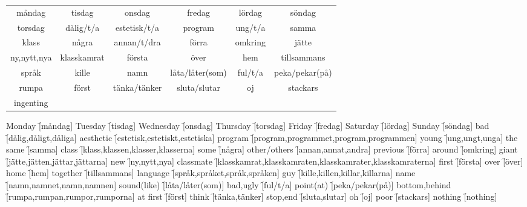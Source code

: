 \begin{center}
    \begin{tabular}{|c c c c c c|}
        \hline
        måndag & tisdag & onsdag & fredag & lördag & söndag \\
        torsdag & dålig/t/a & estetisk/t/a & program & ung/t/a & samma \\
        klass & några & annan/t/dra & förra & omkring & jätte \\
        ny,nytt,nya & klasskamrat & första & över & hem & tillsammans \\
        språk & kille & namn & låta/låter(som) & ful/t/a & peka/pekar(på) \\
        rumpa & först & tänka/tänker & sluta/slutar & oj & stackars \\
        ingenting &  &  &  &  &  \\
        \hline
    \end{tabular}
\end{center}

\begin{questions}
    \begin{multicols}{2}
        \raggedcolumns
        \question Monday \f[måndag]
        \question Tuesday \f[tisdag]
        \question Wednesday \f[onsdag]
        \question Thursday \f[torsdag]
        \question Friday \f[fredag]
        \question Saturday \f[lördag]
        \question Sunday \f[söndag]
        \question bad \f[dålig,dåligt,dåliga]
        \question aesthetic \f[estetisk,estetiskt,estetiska]
        \question program \f[program,programmet,program,programmen]
        \question young \f[ung,ungt,unga]
        \question the same \f[samma]
        \question class \f[klass,klassen,klasser,klasserna]
        \question some \f[några]
        \question other/others \f[annan,annat,andra]
        \question previous \f[förra]
        \question around \f[omkring]
        \question giant \f[jätte,jätten,jättar,jättarna]
        \question new \f[ny,nytt,nya]
        \question classmate \f[klasskamrat,klasskamraten,klasskamrater,klasskamraterna]
        \question first \f[första]
        \question over \f[över]
        \question home \f[hem]
        \question together \f[tillsammans]
        \question language \f[språk,språket,språk,språken]
        \question guy \f[kille,killen,killar,killarna]
        \question name \f[namn,namnet,namn,namnen]
        \question sound(like) \f[låta/låter(som)]
        \question bad,ugly \f[ful/t/a]
        \question point(at) \f[peka/pekar(på)]
        \question bottom,behind \f[rumpa,rumpan,rumpor,rumporna]
        \question at first \f[först]
        \question think \f[tänka,tänker]
        \question stop,end \f[sluta,slutar]
        \question oh \f[oj]
        \question poor \f[stackars]
        \question nothing \f[nothing]
    \end{multicols}
\end{questions}